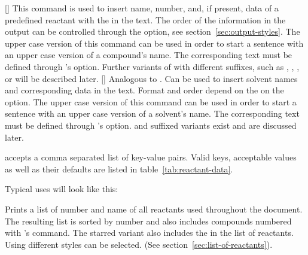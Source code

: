 \documentclass{chemmacros-manual}
\begin{document}
\begin{commands}
  []
    This command is used to insert name, number, and, if present, data of a
    predefined reactant with the  in the text. The order of the
    information in the output can be controlled through the
     option, see
    section~\vref{sec:output-styles}.  The upper case version of this command
     can be used in order to start a sentence with an upper case
    version of a compound's name. The corresponding text must be defined
    through 's  option. Further
    variants of  with different suffixes, such as \sarg,
    \parg, ,  or  will be described later.
  []
    Analogous to . Can be used to insert solvent names and
    corresponding data in the text. Format and order depend on the on the
     option. The upper case version of this
    command  can be used in order to start a sentence with an
    upper case version of a solvent's name. The corresponding text must be
    defined through  's  option.
     and  suffixed variants exist and are discussed later.
\end{commands}

 accepts a comma separated list of key-value pairs. Valid keys,
acceptable values as well as their defaults are listed in table~\vref{tab:reactant-data}.

Typical uses will look like this:
\begin{sourcecode}
\end{sourcecode}

\begin{commands}
    Prints a list of number and name of all reactants used throughout the
    document. The resulting list is sorted by number and also includes
    compounds numbered with 's  command. The starred
    variant also includes the  in the list of reactants. Using
     different styles can be selected. (See
    section~\vref{sec:list-of-reactants}).
\end{commands}
\end{document}
